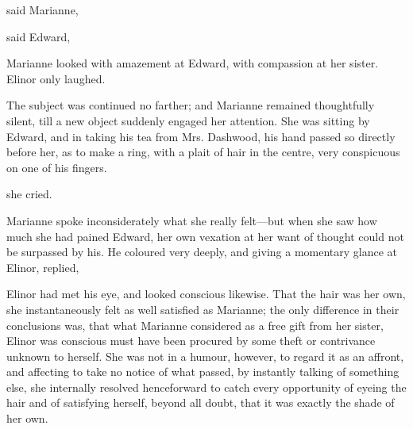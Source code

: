  said Marianne, 

 said Edward, 

Marianne looked with amazement at Edward, with compassion at her sister. Elinor only laughed.

The subject was continued no farther; and Marianne remained thoughtfully silent, till a new object suddenly engaged her attention. She was sitting by Edward, and in taking his tea from Mrs. Dashwood, his hand passed so directly before her, as to make a ring, with a plait of hair in the centre, very conspicuous on one of his fingers.

 she cried. 

Marianne spoke inconsiderately what she really felt---but when she saw how much she had pained Edward, her own vexation at her want of thought could not be surpassed by his. He coloured very deeply, and giving a momentary glance at Elinor, replied, 

Elinor had met his eye, and looked conscious likewise. That the hair was her own, she instantaneously felt as well satisfied as Marianne; the only difference in their conclusions was, that what Marianne considered as a free gift from her sister, Elinor was conscious must have been procured by some theft or contrivance unknown to herself. She was not in a humour, however, to regard it as an affront, and affecting to take no notice of what passed, by instantly talking of something else, she internally resolved henceforward to catch every opportunity of eyeing the hair and of satisfying herself, beyond all doubt, that it was exactly the shade of her own.

